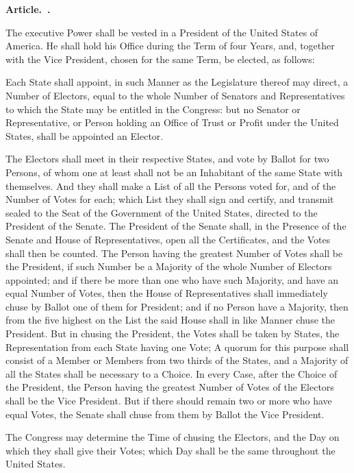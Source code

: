 \documentclass[12pt]{article}
\newcounter{article}
\newenvironment{article}
{\stepcounter{article}\setcounter{sect}{0}\begin{center}
{\bf Article.~\Roman{article}.}
\end{center}}
{}
\newcounter{sect}[article]
\newenvironment{sect}
{\stepcounter{sect}{\bf Section.~\arabic{sect}.}}
{}
\begin{document}
\begin{article}

\begin{sect}
The executive Power shall be vested in a President of the United States of America. He shall hold his Office during the Term of four Years, and, together with the Vice President, chosen for the same Term, be elected, as follows:

Each State shall appoint, in such Manner as the Legislature thereof may direct, a Number of Electors, equal to the whole Number of Senators and Representatives to which the State may be entitled in the Congress: but no Senator or Representative, or Person holding an Office of Trust or Profit under the United States, shall be appointed an Elector.

The Electors shall meet in their respective States, and vote by Ballot for two Persons, of whom one at least shall not be an Inhabitant of the same State with themselves. And they shall make a List of all the Persons voted for, and of the Number of Votes for each; which List they shall sign and certify, and transmit sealed to the Seat of the Government of the United States, directed to the President of the Senate. The President of the Senate shall, in the Presence of the Senate and House of Representatives, open all the Certificates, and the Votes shall then be counted. The Person having the greatest Number of Votes shall be the President, if such Number be a Majority of the whole Number of Electors appointed; and if there be more than one who have such Majority, and have an equal Number of Votes, then the House of Representatives shall immediately chuse by Ballot one of them for President; and if no Person have a Majority, then from the five highest on the List the said House shall in like Manner chuse the President. But in chusing the President, the Votes shall be taken by States, the Representation from each State having one Vote; A quorum for this purpose shall consist of a Member or Members from two thirds of the States, and a Majority of all the States shall be necessary to a Choice. In every Case, after the Choice of the President, the Person having the greatest Number of Votes of the Electors shall be the Vice President. But if there should remain two or more who have equal Votes, the Senate shall chuse from them by Ballot the Vice President.

The Congress may determine the Time of chusing the Electors, and the Day on which they shall give their Votes; which Day shall be the same throughout the United States.


\end{sect}
\end{article}
\end{document}
